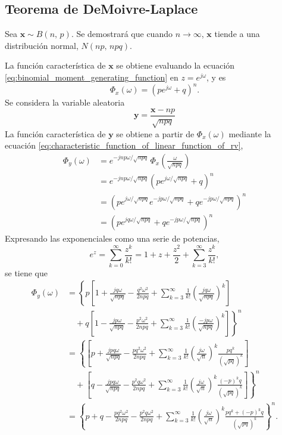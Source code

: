 \documentclass[a4paper]{report}
\newcommand{\x}{\mathbf{x}}
\newcommand{\y}{\mathbf{y}}
\begin{document}
\subsection{Teorema de DeMoivre-Laplace}\label{sec:demoivre_laplace_theorem}

Sea \(\x\sim B(n,\,p)\). Se demostrará que cuando \(n\to\infty\), \(\x\) tiende a una distribución normal, \(N(np,\,npq)\).

La función característica de \(\x\) se obtiene evaluando la ecuación \ref{eq:binomial_moment_generating_function} en \(z=e^{j\omega}\), y es
\[
 \Phi_x(\omega)=\left(pe^{j\omega}+q\right)^n.
\]
Se considera la variable aleatoria
\[
 \y=\frac{\x-np}{\sqrt{npq}}
\]
La función característica de \(\y\) se obtiene a partir de \(\Phi_x(\omega)\) mediante la ecuación \ref{eq:characteristic_function_of_linear_function_of_rv},
\begin{align*}
 \Phi_y(\omega)&=e^{-jnp\omega/\sqrt{npq}}\,\Phi_x\left(\frac{\omega}{\sqrt{npq}}\right)\\
   &=e^{-jnp\omega/\sqrt{npq}}\left(pe^{j\omega/\sqrt{npq}}+q\right)^n\\
   &=\left(pe^{j\omega/\sqrt{npq}}e^{-jp\omega/\sqrt{npq}}+qe^{-jp\omega/\sqrt{npq}}\right)^n\\
   &=\left(pe^{jq\omega/\sqrt{npq}}+qe^{-jp\omega/\sqrt{npq}}\right)^n
\end{align*}
Expresando las exponenciales como una serie de potencias, 
\[
 e^z=\sum_{k=0}^{\infty}\frac{z^{k}}{k!}=1+z+\frac{z^2}{2}+\sum_{k=3}^{\infty}\frac{z^{k}}{k!},
\]
se tiene que
\begin{align*}
 \Phi_y(\omega)&=\left\{p\left[1+\frac{jq\omega}{\sqrt{npq}}-\frac{q^2\omega^2}{2npq}+\sum_{k=3}^{\infty }\frac{1}{k!}\left(\frac{jq\omega}{\sqrt{npq}}\right)^k\right]\right.\\
   &\quad+\left. q\left[1-\frac{jp\omega}{\sqrt{npq}}-\frac{p^2\omega^2}{2npq}+\sum_{k=3}^{\infty }\frac{1}{k!}\left(\frac{-jp\omega}{\sqrt{npq}}\right)^k\right]\right\}^n\\
 &=\left\{\left[p+\frac{jpq\omega}{\sqrt{npq}}-\frac{pq^2\omega^2}{2npq}
  +\sum_{k=3}^{\infty }\frac{1}{k!}\left(\frac{j\omega}{\sqrt{n}}\right)^k\frac{pq^k}{\left(\sqrt{pq}\right)^k}\right]\right.\\
   &\quad+\left. \left[q-\frac{jpq\omega}{\sqrt{npq}}-\frac{p^2q\omega^2}{2npq} 
  +\sum_{k=3}^{\infty }\frac{1}{k!}\left(\frac{j\omega}{\sqrt{n}}\right)^k\frac{(-p)^kq}{\left(\sqrt{pq}\right)^k}\right]\right\}^n\\
 &=\left\{p+q-\frac{pq^2\omega^2}{2npq}-\frac{p^2q\omega^2}{2npq}
  +\sum_{k=3}^{\infty }\frac{1}{k!}\left(\frac{j\omega}{\sqrt{n}}\right)^k
  \frac{pq^k+(-p)^kq}{\left(\sqrt{pq}\right)^k}\right\}^n.
\end{align*}
\end{document}
